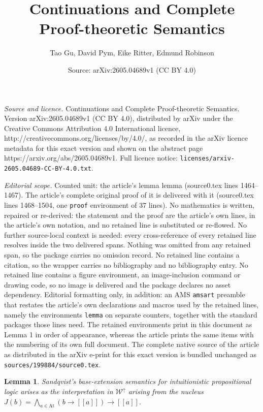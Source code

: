 \documentclass[10pt,a4paper]{amsart}
\title{Continuations and Complete Proof-theoretic Semantics}
\author{Tao Gu, David Pym, Eike Ritter, Edmund Robinson}
\date{Source: arXiv:2605.04689v1 (CC BY 4.0)}
\newtheorem{lemma}{Lemma}
\newcommand{\At}{\text{At}}
\newcommand{\db}[1]{[\![#1]\!]}
\newcommand{\worlds}{\mathcal W}
\begin{document}
\maketitle

\noindent\emph{Source and licence.} Continuations and Complete Proof-theoretic Semantics. Version arXiv:2605.04689v1 (CC BY 4.0), distributed by arXiv under the Creative Commons Attribution 4.0 International licence, http://creativecommons.org/licenses/by/4.0/, as recorded in the arXiv licence metadata for this exact version and shown on the abstract page https://arxiv.org/abs/2605.04689v1. Full licence notice: \texttt{licenses/arxiv-2605.04689-CC-BY-4.0.txt}.\par\smallskip

\noindent\textit{Editorial scope.} Counted unit: the article's lemma lemma (source0.tex lines 1464--1467). The article's complete original proof of it is delivered with it (source0.tex lines 1468--1504, one \texttt{proof} environment of 37 lines). No mathematics is written, repaired or re-derived: the statement and the proof are the article's own lines, in the article's own notation, and no retained line is substituted or re-flowed.  No further source-local context is needed: every cross-reference of every retained line resolves inside the two delivered spans.  Nothing was omitted from any retained span, so the package carries no omission record.  No retained line contains a citation, so the wrapper carries no bibliography and no bibliography entry.  No retained line contains a figure environment, an image-inclusion command or drawing code, so no image is delivered and the package declares no asset dependency.  Editorial formatting only, in addition: an AMS \texttt{amsart} preamble that restates the article's own declarations and macros used by the retained lines, namely the environments \texttt{lemma} on separate counters, together with the standard packages those lines need.  The retained environments print in this document as Lemma 1 in order of appearance, whereas the article prints the same items with the numbering of its own full document.  The complete native source of the article as distributed in the arXiv e-print for this exact version is bundled unchanged as \texttt{sources/199884/source0.tex}.
\begin{lemma}
Sandqvist's base-extension semantics for intuitionistic propositional logic arises as %
the interpretation in $\worlds^\uparrow$ arising from the nucleus $J(b) = \bigwedge_{a\in\At} (b \to \db{a}) \to \db{a}$.
\end{lemma}
\end{document}
